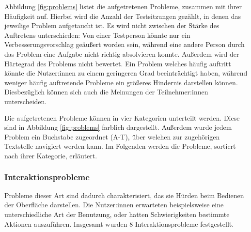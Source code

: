 Abbildung \ref{fig:problems} listet die aufgetretenen Probleme, zusammen mit ihrer Häufigkeit auf. Hierbei wird die Anzahl der Testsitzungen gezählt, in denen das jeweilige Problem aufgetaucht ist. Es wird nicht zwischen der Stärke des Auftretens unterschieden: Von einer Testperson könnte nur ein Verbesserungsvorschlag geäußert worden sein, während eine andere Person durch das Problem eine Aufgabe nicht richtig absolvieren konnte. Außerdem wird der Härtegrad des Problems nicht bewertet. Ein Problem welches häufig auftritt könnte die Nutzer:innen zu einem geringeren Grad beeinträchtigt haben, während weniger häufig auftretende Probleme ein größeres Hindernis darstellen können. Diesbezüglich können sich auch die Meinungen der Teilnehmer:innen unterscheiden.

Die aufgetretenen Probleme können in vier Kategorien unterteilt werden. Diese sind in Abbildung \ref{fig:problems} farblich dargestellt. Außerdem wurde jedem Problem ein Buchstabe zugeordnet (A-T), über welchen zur zugehörigen Textstelle navigiert werden kann. Im Folgenden werden die Probleme, sortiert nach ihrer Kategorie, erläutert.

\subsubsection{Interaktionsprobleme}

Probleme dieser Art sind dadurch charakterisiert, das sie Hürden beim Bedienen der Oberfläche darstellen. Die Nutzer:innen erwarteten beispielsweise eine unterschiedliche Art der Benutzung, oder hatten Schwierigkeiten bestimmte Aktionen auszuführen. Insgesamt wurden 8 Interaktionsprobleme festgestellt.

